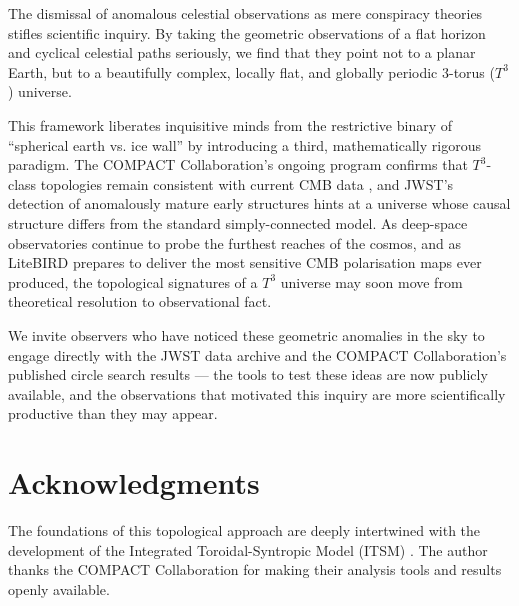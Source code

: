 \documentclass[aps,prd,11pt,onecolumn,superscriptaddress,nofootinbib,floatfix]{revtex4-2}
\begin{document}
The dismissal of anomalous celestial observations as mere conspiracy theories stifles scientific inquiry. By taking the geometric observations of a flat horizon and cyclical celestial paths seriously, we find that they point not to a planar Earth, but to a beautifully complex, locally flat, and globally periodic 3-torus ($T^3$) universe.

This framework liberates inquisitive minds from the restrictive binary of ``spherical earth vs. ice wall'' by introducing a third, mathematically rigorous paradigm. The COMPACT Collaboration's ongoing program confirms that $T^3$-class topologies remain consistent with current CMB data \cite{compact_promise, compact_pt1}, and JWST's detection of anomalously mature early structures \cite{finner_2025} hints at a universe whose causal structure differs from the standard simply-connected model. As deep-space observatories continue to probe the furthest reaches of the cosmos, and as LiteBIRD \cite{litebird_2020} prepares to deliver the most sensitive CMB polarisation maps ever produced, the topological signatures of a $T^3$ universe may soon move from theoretical resolution to observational fact.

We invite observers who have noticed these geometric anomalies in the sky to engage directly with the JWST data archive and the COMPACT Collaboration's published circle search results --- the tools to test these ideas are now publicly available, and the observations that motivated this inquiry are more scientifically productive than they may appear.

\section*{Acknowledgments}
The foundations of this topological approach are deeply intertwined with the development of the Integrated Toroidal-Syntropic Model (ITSM) \cite{itsm_main}. The author thanks the COMPACT Collaboration for making their analysis tools and results openly available.
\end{document}

